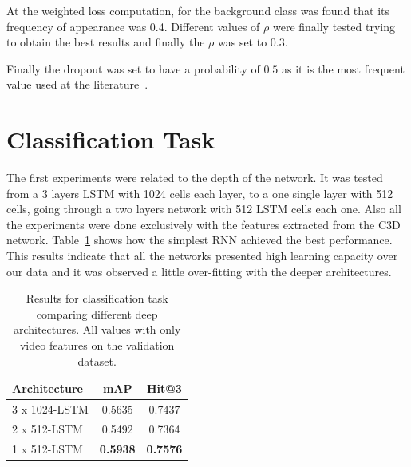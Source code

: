 At the weighted loss computation, for the background class was found that its frequency of appearance was 0.4. Different values of $\rho$ were finally tested trying to obtain the best results and finally the $\rho$ was set to $0.3$.

Finally the dropout was set to have a probability of $0.5$ as it is the most frequent value used at the literature~\cite{srivastava2014dropout}.


\section{Classification Task}

The first experiments were related to the depth of the network.
It was tested from a 3 layers LSTM with 1024 cells each layer, to a one single layer with 512 cells, going through a two layers network with 512 LSTM cells each one.
Also all the experiments were done exclusively with the features extracted from the C3D network.
Table~\ref{table:classification_by_architecture} shows how the simplest RNN achieved the best performance. This results indicate that all the networks presented high learning capacity over our data and it was observed a little over-fitting with the deeper architectures.

\begin{table}[H]
\begin{center}
\begin{tabular}{|l|c|c|}
\hline
\textbf{Architecture} & \textbf{mAP} & \textbf{Hit@3} \\
\hline\hline
3 x 1024-LSTM & 0.5635 & 0.7437 \\
2 x 512-LSTM & 0.5492 & 0.7364 \\
1 x 512-LSTM & \bf0.5938 & \bf0.7576 \\
\hline
\end{tabular}
\end{center}
\caption{Results for classification task comparing different deep architectures. All values with
         only video features on the validation dataset.}
\label{table:classification_by_architecture}
\end{table}

